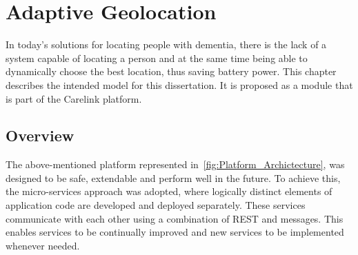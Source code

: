 
\chapter{Adaptive Geolocation}
\label{cha:Adaptive_Geolocation}

In today's solutions for locating people with dementia, there is the lack of a system capable of locating a person and at the same time being able to dynamically choose the best location, thus saving battery power. 
This chapter describes the intended model for this dissertation.
It is proposed as a module that is part of the Carelink platform.


\section{Overview}
\label{sec:overview}

The above-mentioned platform represented in~\ref{fig:Platform_Archictecture}, was designed to be safe, extendable and perform well in the future. To achieve this, the micro-services approach was adopted, where logically distinct elements of application code are developed and deployed separately. These services communicate with each other using a combination of REST and messages. This enables services to be continually improved and new services to be implemented whenever needed. 

